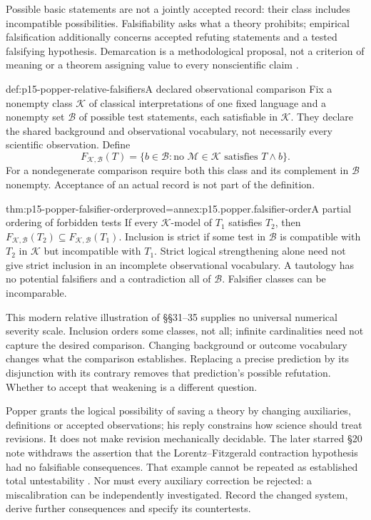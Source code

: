 Possible basic statements are not a jointly accepted record:
their class includes incompatible possibilities. Falsifiability
asks what a theory prohibits; empirical falsification additionally
concerns accepted refuting statements and a tested falsifying
hypothesis. Demarcation is a methodological proposal, not a criterion
of meaning or a theorem assigning value to every nonscientific claim
\parencite[\S\S4,6,21--22]{Popper2002LogicDiscoveryUI}.

\begin{hbdefinition}{def:p15-popper-relative-falsifiers}{A declared observational comparison}
Fix a nonempty class \(\mathcal K\) of classical interpretations
of one fixed language
and a nonempty set \(\mathcal B\) of possible test statements,
each satisfiable in \(\mathcal K\). They declare the shared
background and observational vocabulary, not necessarily every
scientific observation. Define
\[
F_{\mathcal K,\mathcal B}(T)
=\{b\in\mathcal B:\text{no }\mathcal M\in\mathcal K
                         \text{ satisfies }T\land b\}.
\]
For a nondegenerate comparison require both this class and its
complement in \(\mathcal B\) nonempty.
Acceptance of an actual record is not part of the definition.
\end{hbdefinition}

\begin{hbtheorem}{thm:p15-popper-falsifier-order}{proved=annex:p15.popper.falsifier-order}{A partial ordering of forbidden tests}
If every \(\mathcal K\)-model of \(T_1\) satisfies \(T_2\),
then \(F_{\mathcal K,\mathcal B}(T_2)\subseteq
F_{\mathcal K,\mathcal B}(T_1)\).
Inclusion is strict if some test in \(\mathcal B\) is compatible with
\(T_2\) in \(\mathcal K\) but incompatible with \(T_1\).
Strict logical strengthening alone need not give strict inclusion
in an incomplete observational vocabulary.
A tautology has no potential falsifiers and a contradiction all
of \(\mathcal B\). Falsifier classes can be incomparable.
\end{hbtheorem}

This modern relative illustration of \S\S31--35 supplies no
universal numerical severity scale. Inclusion orders some classes,
not all; infinite cardinalities need not capture the desired
comparison. Changing background or outcome vocabulary changes
what the comparison establishes.
Replacing a precise prediction by its disjunction with its contrary
removes that prediction's possible refutation. Whether to accept
that weakening is a different question.

Popper grants the logical possibility of saving a theory by changing
auxiliaries, definitions or accepted observations; his reply constrains
how science should treat revisions. It does not make revision
mechanically decidable. The later starred \S20 note withdraws the
assertion that the Lorentz--Fitzgerald contraction hypothesis had
no falsifiable consequences. That example cannot be repeated as
established total untestability
\parencite[\S\S19--20,note *1]{Popper2002LogicDiscoveryUI}.
Nor must every auxiliary correction be rejected: a miscalibration
can be independently investigated. Record the changed system,
derive further consequences and specify its countertests.

